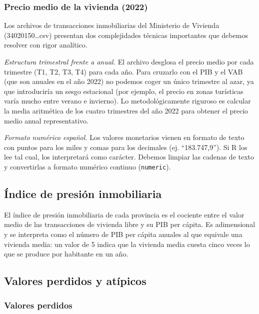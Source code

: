 \documentclass[econometrics,article,submit,moreauthors,pdftex]{Definitions/mdpi}
\begin{document}
\subsubsection{Precio medio de la vivienda
(2022)}\label{precio-medio-de-la-vivienda-2022}

Los archivos de transacciones inmobiliarias del Ministerio de Vivienda
(34020150\ldots csv) presentan dos complejidades técnicas importantes
que debemos resolver con rigor analítico.

\emph{Estructura trimestral frente a anual.} El archivo desglosa el
precio medio por cada trimestre (T1, T2, T3, T4) para cada año. Para
cruzarlo con el PIB y el VAB (que son anuales en el año 2022) no podemos
coger un único trimestre al azar, ya que introduciría un sesgo
estacional (por ejemplo, el precio en zonas turísticas varía mucho entre
verano e invierno). Lo metodológicamente riguroso es calcular la media
aritmética de los cuatro trimestres del año 2022 para obtener el precio
medio anual representativo.

\emph{Formato numérico español.} Los valores monetarios vienen en
formato de texto con puntos para los miles y comas para los decimales
(ej. ``183.747,9''). Si R los lee tal cual, los interpretará como
carácter. Debemos limpiar las cadenas de texto y convertirlas a formato
numérico continuo (\texttt{numeric}).

\subsection{Índice de presión
inmobiliaria}\label{uxedndice-de-presiuxf3n-inmobiliaria}

El índice de presión inmobiliaria de cada provincia es el cociente entre
el valor medio de las transacciones de vivienda libre y su PIB per
cápita. Es adimensional y se interpreta como el número de PIB per cápita
anuales al que equivale una vivienda media: un valor de 5 indica que la
vivienda media cuesta cinco veces lo que se produce por habitante en un
año.

\subsection{Valores perdidos y
atípicos}\label{valores-perdidos-y-atuxedpicos}

\subsubsection{Valores perdidos}\label{valores-perdidos}
\end{document}
